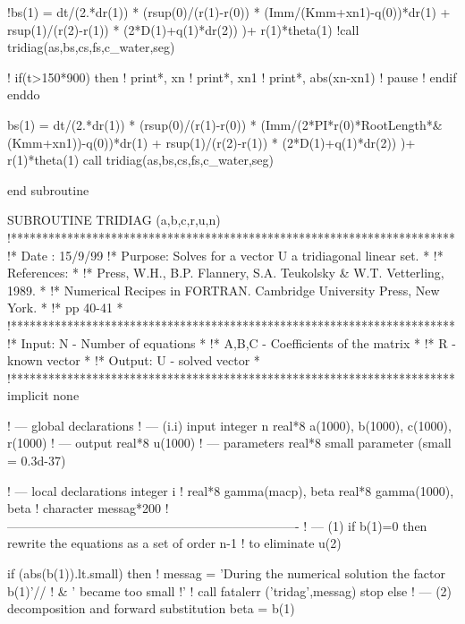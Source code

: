     !bs(1) = dt/(2.*dr(1)) * (rsup(0)/(r(1)-r(0)) * (Imm/(Kmm+xn1)-q(0))*dr(1) + rsup(1)/(r(2)-r(1)) * (2*D(1)+q(1)*dr(2)) )+ r(1)*theta(1) 
    !call tridiag(as,bs,cs,fs,c_water,seg)
    
!    if(t>150*900) then
!      print*, xn
!      print*, xn1
!      print*, abs(xn-xn1)
!      pause
!    endif
  enddo

  bs(1) = dt/(2.*dr(1)) * (rsup(0)/(r(1)-r(0)) * (Imm/(2*PI*r(0)*RootLength*&
(Kmm+xn1))-q(0))*dr(1) + rsup(1)/(r(2)-r(1)) * (2*D(1)+q(1)*dr(2)) )+ r(1)*theta(1) 
  call tridiag(as,bs,cs,fs,c_water,seg)

end subroutine

SUBROUTINE TRIDIAG (a,b,c,r,u,n)
!***********************************************************************
!* Date      : 15/9/99                                    
!* Purpose:    Solves for a vector U a tridiagonal linear set.         *
!* References:                                                         *
!* Press, W.H., B.P. Flannery, S.A. Teukolsky & W.T. Vetterling, 1989. *
!* Numerical Recipes in FORTRAN. Cambridge University Press, New York. *
!* pp 40-41                                                            *
!***********************************************************************
!* Input:     N -      Number of equations                             *
!*            A,B,C -  Coefficients of the matrix                      *
!*            R -      known vector                                    *
!* Output:    U -      solved vector                                   *
!***********************************************************************
      implicit none

! --- global declarations
! --- (i.i) input
      integer   n
      real*8    a(1000), b(1000), c(1000), r(1000)
! --- output
      real*8    u(1000)
! --- parameters
      real*8    small
      parameter (small = 0.3d-37)

! --- local declarations
      integer   i
!      real*8    gamma(macp), beta
	  real*8    gamma(1000), beta
!      character messag*200
! ----------------------------------------------------------------------
! --- (1) if b(1)=0 then rewrite the equations as a set of order n-1
!     to eliminate u(2)

      if (abs(b(1)).lt.small) then
!        messag = 'During the numerical solution the factor b(1)'//
!     &  ' became too small !'
!        call fatalerr ('tridag',messag)
	    stop
      else
! ---   (2) decomposition and forward substitution
        beta = b(1)


